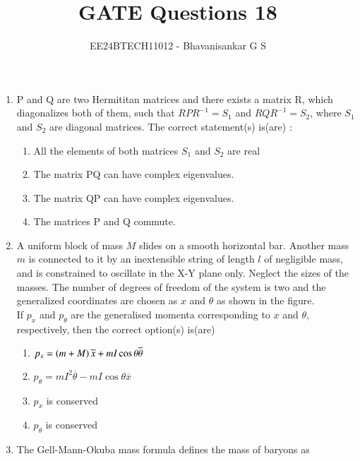 \documentclass[journal]{IEEEtran}
\begin{document}

\vspace{3cm}

\title{GATE Questions 18}
\author{EE24BTECH11012 - Bhavanisankar G S}
{\let\newpage\relax\maketitle}
\begin{enumerate}
	\item P and Q are two Hermititan matrices and there exists a matrix R, which diagonalizes both of them, such that $RPR^{-1} = S_1$ and $RQR^{-1} = S_2$, where $S_1$ and $S_2$ are diagonal matrices. The correct statement(s) is(are) :
		\begin{enumerate}
			\item All the elements of both matrices $S_1$ and $S_2$ are real
			\item The matrix PQ can have complex eigenvalues.
			\item The matrix QP can have complex eigenvalues.
			\item The matrices P and Q commute.
		\end{enumerate}
	\item A uniform block of mass $M$ slides on a smooth horizontal bar. Another mass $m$ is connected to it by an inextensible string of length $l$ of negligible mass, and is constrained to oscillate in the X-Y plane only. Neglect the sizes of the masses. The number of degrees of freedom of the system is two and the generalized coordinates are chosen as $x$ and $\theta$ as shown in the figure. \\
		If $p_x$ and $p_{\theta}$ are the generalised momenta corresponding to $x$ and $\theta$, respectively, then the correct option(s) is(are)
		\begin{enumerate}
	\item $p_x = \left(m+M\right) \overline{x} + mI\cos{\theta} \overline{\theta}$
	\item $p_{\theta} = mI^2 \overline{\theta} - mI \cos{\theta} \overline{x}$
	\item $p_x$ is conserved
	\item $p_{\theta}$ is conserved
		\end{enumerate}
	\item The Gell-Mann-Okuba mass formula defines the mass of baryons as 

\end{enumerate}
\end{document}
